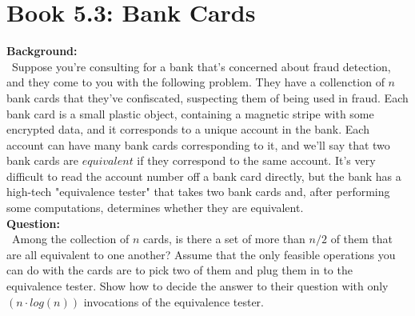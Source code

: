 \documentclass[12pt]{article}
\begin{document}

\newcommand{\hmwkClass}{COS 255}
\newcommand{\hmwkSemester}{Spring 2016}

\newcommand{\hmwkAuthorName}{Lukas Leung}
\newcommand{\hmwkAuthorID}{lleung}

\newcommand{\hmwkAssignmentNum}{4}

\newcommand{\hmwkProblemNum}{0}

\newcommand{\hmwkCollaborators}{}
\thispagestyle{fancycollab}


\section{Book 5.3: Bank Cards}
\textbf{Background:} \\
~\indent Suppose you're consulting for a bank that's concerned about
fraud detection, and they come to you with the following problem.
They have a collenction of $n$ bank cards that they've confiscated,
suspecting them of being used in fraud. Each bank card is a small
plastic object, containing a magnetic stripe with some encrypted
data, and it corresponds to a unique account in the bank. Each account
can have many bank cards corresponding to it, and we'll say that
two bank cards are $equivalent$ if they correspond to the same
account. It's very difficult to read the account number off a bank
card directly, but the bank has a high-tech "equivalence tester"
that takes two bank cards and, after performing some computations,
determines whether they are equivalent. \\
\textbf{Question:} \\
~\indent Among the collection of $n$ cards, is there a set of more
than $n/2$ of them that are all equivalent to one another? Assume
that the only feasible operations you can do with the cards are to
pick two of them and plug them in to the equivalence tester. Show
how to decide the answer to their question with only $(n\cdot log(n))$
invocations of the equivalence tester.
\end{document}
